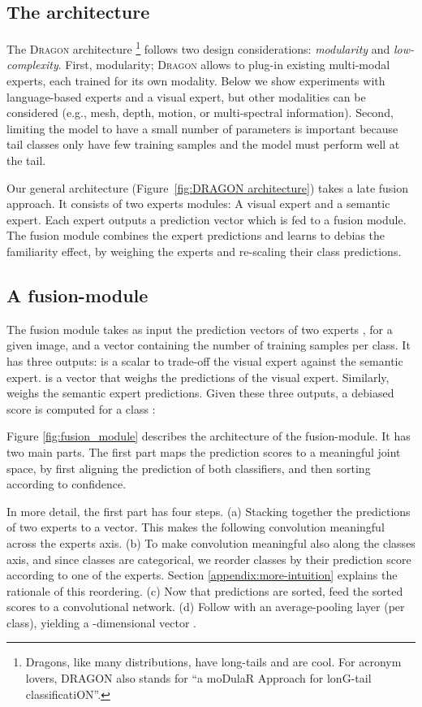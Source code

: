 \documentclass[10pt,twocolumn,letterpaper]{article}
\newcommand{\figref}[1]{Figure~\ref{#1}}
\newcommand{\DRAGON}{\textsc{Dragon}}
\begin{document}
\subsection{The architecture}
The \DRAGON{} architecture
\footnote{Dragons, like many distributions, have long-tails and are cool. For acronym lovers, \textsc{DRAGON} also stands for ``a moDulaR Approach for lonG-tail classificatiON''.} 
follows two design considerations: \textit{modularity} and \textit{low-complexity}. First, modularity;  \DRAGON{} allows to plug-in existing multi-modal experts, each trained for its own modality. Below we show experiments with language-based experts and a visual expert, but other modalities can be considered (e.g., mesh, depth, motion, or multi-spectral information).
Second, limiting the model to have a small number of parameters is important because tail classes only have few training samples and the model must perform well at the tail.

Our general architecture (\figref{fig:DRAGON architecture}) takes a late fusion approach. It consists of two experts modules: A visual expert and a semantic expert. Each expert outputs a prediction vector which is fed to a fusion module. The fusion module combines the expert predictions and learns to debias the familiarity effect, by weighing the experts and re-scaling their class predictions.


\subsection{A fusion-module}
\label{sec:fusion_module}
The fusion module takes as input the prediction vectors of two experts ,  for a given image, and a vector containing the number of training samples per class. It has three outputs:   is a scalar to trade-off the visual expert against the semantic expert. 
 is a vector that weighs the predictions of the visual expert. Similarly,  weighs the semantic expert predictions. Given these three outputs, a debiased score is computed for a class :

Figure \ref{fig:fusion_module} describes the architecture of the fusion-module. 
It has two main parts. The first part maps the prediction scores to a meaningful joint space, 
by first aligning the prediction of both classifiers, and then sorting according to confidence.

In more detail, the first part has four steps. (a) Stacking together the predictions of two experts to a  vector. This makes the following convolution meaningful across the  experts axis. (b) To make convolution meaningful also along the classes axis, and since classes are categorical, we reorder classes by their prediction score according to one of the experts. Section \ref{appendix:more-intuition} explains the rationale of this reordering. (c) Now that predictions are sorted, feed the sorted scores to a  convolutional network. (d) Follow with an average-pooling layer (per class), yielding a -dimensional vector . 
\end{document}
